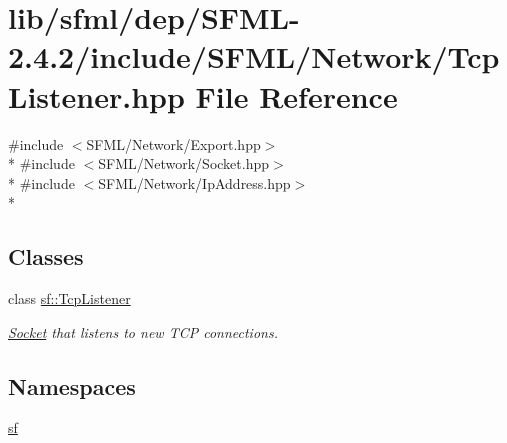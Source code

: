 \hypertarget{sfml_2dep_2_s_f_m_l-2_84_82_2include_2_s_f_m_l_2_network_2_tcp_listener_8hpp}{\section{lib/sfml/dep/\-S\-F\-M\-L-\/2.4.2/include/\-S\-F\-M\-L/\-Network/\-Tcp\-Listener.hpp File Reference}
\label{sfml_2dep_2_s_f_m_l-2_84_82_2include_2_s_f_m_l_2_network_2_tcp_listener_8hpp}
}
{\ttfamily \#include $<$S\-F\-M\-L/\-Network/\-Export.\-hpp$>$}\\*
{\ttfamily \#include $<$S\-F\-M\-L/\-Network/\-Socket.\-hpp$>$}\\*
{\ttfamily \#include $<$S\-F\-M\-L/\-Network/\-Ip\-Address.\-hpp$>$}\\*
\subsection*{Classes}
\begin{DoxyCompactItemize}
\item 
class \hyperlink{classsf_1_1_tcp_listener}{sf\-::\-Tcp\-Listener}
\begin{DoxyCompactList}\small\item\em \hyperlink{classsf_1_1_socket}{Socket} that listens to new T\-C\-P connections. \end{DoxyCompactList}\end{DoxyCompactItemize}
\subsection*{Namespaces}
\begin{DoxyCompactItemize}
\item 
\hyperlink{namespacesf}{sf}
\end{DoxyCompactItemize}
